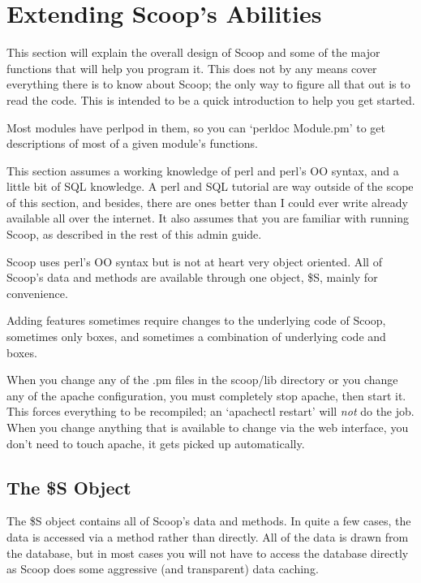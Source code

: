 \section{Extending Scoop's Abilities}
\label{hacking}

This section will explain the overall design of Scoop and some of the major functions that will help you program it. This does not by any means cover everything there is to know about Scoop; the only way to figure all that out is to read the code. This is intended to be a quick introduction to help you get started.

Most modules have perlpod in them, so you can `perldoc Module.pm' to get descriptions of most of a given module's functions.

This section assumes a working knowledge of perl and perl's OO syntax, and a little bit of SQL knowledge. A perl and SQL tutorial are way outside of the scope of this section, and besides, there are ones better than I could ever write already available all over the internet. It also assumes that you are familiar with running Scoop, as described in the rest of this admin guide.

Scoop uses perl's OO syntax but is not at heart very object oriented. All of Scoop's data and methods are available through one object, \$S, mainly for convenience.

Adding features sometimes require changes to the underlying code of Scoop, sometimes only boxes, and sometimes a combination of underlying code and boxes.

When you change any of the .pm files in the scoop/lib directory or you change any of the apache configuration, you must completely stop apache, then start it. This forces everything to be recompiled; an `apachectl restart' will {\em not} do the job. When you change anything that is available to change via the web interface, you don't need to touch apache, it gets picked up automatically.

\subsection{The \$S Object}
\label{hacking-s}

The \$S object contains all of Scoop's data and methods. In quite a few cases, the data is accessed via a method rather than directly. All of the data is drawn from the database, but in most cases you will not have to access the database directly as Scoop does some aggressive (and transparent) data caching.

